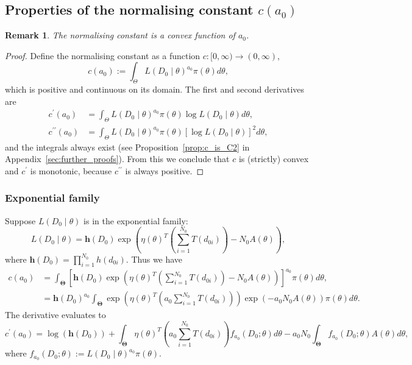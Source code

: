 \documentclass[a4paper, notitlepage, 11pt]{article}
\newtheorem{remark}{Remark}[]
\begin{document}
\subsection{Properties of the normalising constant $c(a_0)$}

\begin{remark}
\label{rmk:convex_norm_constant}
 The normalising constant is a convex function of $a_0$.
\end{remark}
\begin{proof}
Define the normalising constant as a function $c : [0, \infty) \to (0, \infty)$,
\begin{equation}
 \label{eq:normconst}
 c(a_0) := \int_{\Theta} L(D_0\mid\theta)^{a_0} \pi(\theta)d\theta,
\end{equation}
which is positive and continuous on its domain.
The first and second derivatives are
\begin{align}
\label{eq:derivative_ca0}
c^\prime(a_0) &= \int_{\Theta} L(D_0\mid\theta)^{a_0} \pi(\theta) \log L(D_0\mid\theta) d\theta, \\
c^{\prime\prime}(a_0) &= \int_{\Theta} L(D_0\mid\theta)^{a_0} \pi(\theta) [\log L(D_0\mid\theta)]^2 d\theta,
\end{align}
and the integrals always exist (see Proposition~\ref{prop:c_is_C2} in Appendix~\ref{sec:further_proofs}). %
From this we conclude that $c$ is (strictly) convex and $c^\prime$ is monotonic, because $c^{\prime\prime}$ is always positive.
\end{proof}


\subsubsection{Exponential family}

Suppose $L(D_0 \mid \theta)$ is in the exponential family:
\begin{equation}
 L(D_0 \mid \theta) = \boldsymbol h(D_0) \exp \left( \eta(\theta)^T \left(\sum_{i=1}^{N_0} T(d_{0i}) \right) - N_0 A(\theta) \right),
\end{equation}
where $\boldsymbol h(D_0) = \prod_{i = 1}^{N_0} h(d_{0i})$.
Thus we have
\begin{align}
 c(a_0) &=  \int_{\boldsymbol\Theta} \left[ \boldsymbol h(D_0) \exp \left( \eta(\theta)^T \left(\sum_{i=1}^{N_0} T(d_{0i}) \right) - N_0 A(\theta) \right) \right]^{a_0}\pi(\theta) d\theta, \\
  \label{eq:expo_family_const}
 &= \boldsymbol h(D_0)^{a_0}\int_{\boldsymbol\Theta} \exp \left( \eta(\theta)^T \left(a_0 \sum_{i=1}^{N_0} T(d_{0i}) \right) \right) \exp\left(- a_0N_0 A(\theta) \right) \pi(\theta) d\theta.
\end{align}
The derivative evaluates to 
\begin{equation}
\label{eq:expo_family_deriv_general}
 c^\prime(a_0) = \log(\boldsymbol h(D_0)) + \int_{\boldsymbol\Theta} \eta(\theta)^T \left(a_0 \sum_{i=1}^{N_0} T(d_{0i}) \right) f_{a_0}(D_0; \theta) d\theta -  a_0N_0\int_{\boldsymbol\Theta} f_{a_0}(D_0; \theta)  A(\theta) d\theta,
\end{equation}
where $f_{a_0}(D_0; \theta) := L(D_0 \mid \theta)^{a_0}\pi(\theta)$.
\end{document}
